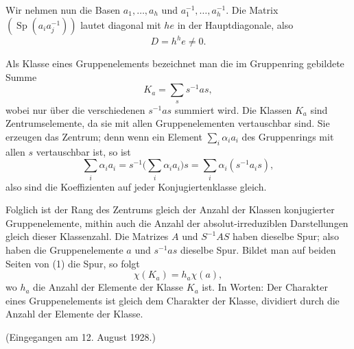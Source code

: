 \documentclass[11pt]{article}
\begin{document}
Wir nehmen nun die Basen $a_1,\ldots,a_h$ und $a_1^{-1},\ldots,a_h^{-1}$. Die Matrix $(\operatorname{Sp}(a_i a_j^{-1}))$ lautet diagonal mit $he$ in der Hauptdiagonale, also
\[
        D=h^h e\ne0.
\]

Als Klasse eines Gruppenelements bezeichnet man die im Gruppenring gebildete Summe
\[
        K_a=\sum_s s^{-1}as,                         \tag{1}
\]
wobei nur über die verschiedenen $s^{-1}as$ summiert wird. Die Klassen $K_a$ sind Zentrumselemente, da sie mit allen Gruppenelementen vertauschbar sind. Sie erzeugen das Zentrum; denn wenn ein Element $\sum_i\alpha_i a_i$ des Gruppenrings mit allen $s$ vertauschbar ist, so ist
\[
        \sum_i\alpha_i a_i=s^{-1}\biggl(\sum_i\alpha_i a_i\biggr)s
        =\sum_i\alpha_i(s^{-1}a_i s),
\]
also sind die Koeffizienten auf jeder Konjugiertenklasse gleich.

Folglich ist der Rang des Zentrums gleich der Anzahl der Klassen konjugierter Gruppenelemente, mithin auch die Anzahl der absolut-irreduziblen Darstellungen gleich dieser Klassenzahl. Die Matrizes $A$ und $S^{-1}AS$ haben dieselbe Spur; also haben die Gruppenelemente $a$ und $s^{-1}as$ dieselbe Spur. Bildet man auf beiden Seiten von (1) die Spur, so folgt
\[
        \chi(K_a)=h_a\chi(a),
\]
wo $h_a$ die Anzahl der Elemente der Klasse $K_a$ ist. In Worten: Der Charakter eines Gruppenelements ist gleich dem Charakter der Klasse, dividiert durch die Anzahl der Elemente der Klasse.

\begin{center}
(Eingegangen am 12. August 1928.)
\end{center}
\end{document}
